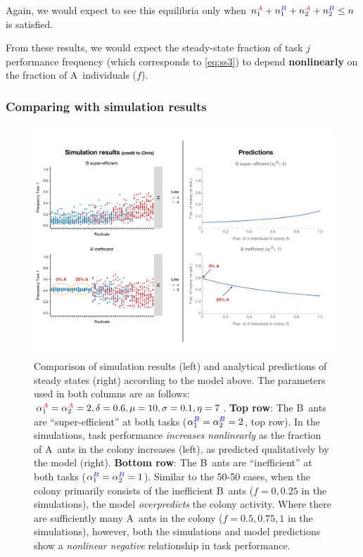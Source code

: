 \documentclass[10pt]{article}
\theoremstyle{remark}
\newcommand{\A}{{\color{red}A}}
\newcommand{\B}{{\color{blue}B}}
\begin{document}
Again, we would expect to see this equilibria only when $n_1^{\A} + n_1^{\B} + n_2^{\A}+ n_2^{\B} \leq n$ is satisfied.

From these results, we would expect the steady-state fraction of task $j$ performance frequency (which corresponds to \eqref{eq:ss3}) to depend \textbf{nonlinearly} on the fraction of \A\ individuals ($f$). \\

\subsubsection{Comparing with simulation results}
\begin{figure}[H]
    \centering
    \includegraphics[trim={0 1in 0 0.75in}, clip, width=0.9\linewidth]{output/Task_dist/mixes_comparison.pdf}
    \caption{Comparison of simulation results (left) and analytical predictions of steady states (right) according to the model above. The parameters used in both columns are as follows: $\alpha_1^{\A} = \alpha_2^{\A} = 2, \delta= 0.6, \mu=10, \sigma = 0.1, \eta = 7$. 
    \textbf{Top row}: The \B\ ants are ``super-efficient'' at both tasks ($\alpha_1^{\B} = \alpha_2^{\B} = 2$, top row). In the simulations, task performance \textit{increases nonlinearly} as the fraction of \A\ ants in the colony increases (left), as predicted qualitatively by the model (right).
    \textbf{Bottom row}: The \B\ ants are ``inefficient'' at both tasks ($\alpha_1^{\B} = \alpha_2^{\B} = 1$). 
    Similar to the 50-50 cases, when the colony primarily consists of the inefficient \B\ ants ($f = 0, 0.25$ in the simulations), the model \textit{overpredicts} the colony activity.
    Where there are sufficiently many \A\ ants in the colony ($f = 0.5, 0.75, 1$ in the simulations), however, both the simulations and model predictions show a \textit{nonlinear negative} relationship in task performance.}
    \label{fig:mixes_comp}
\end{figure}
\end{document}
